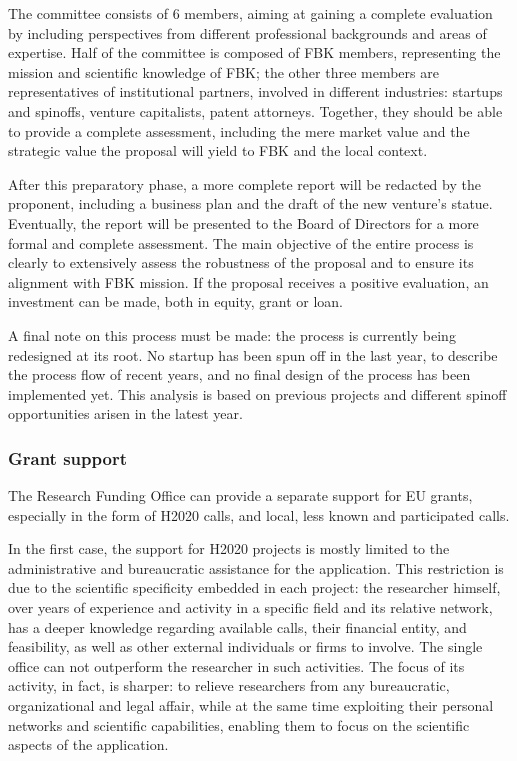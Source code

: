 The committee consists of 6 members, aiming at gaining a complete evaluation by including perspectives from different professional backgrounds and areas of expertise. Half of the committee is composed of FBK members, representing the mission and scientific knowledge of FBK; the other three members are representatives of institutional partners, involved in different industries: startups and spinoffs, venture capitalists, patent attorneys. Together, they should be able to provide a complete assessment, including the mere market value and the strategic value the proposal will yield to FBK and the local context.

After this preparatory phase, a more complete report will be redacted by the proponent, including a business plan and the draft of the new venture's statue. Eventually, the report will be presented to the Board of Directors for a more formal and complete assessment. The main objective of the entire process is clearly to extensively assess the robustness of the proposal and to ensure its alignment with FBK mission. If the proposal receives a positive evaluation, an investment can be made, both in equity, grant or loan.

A final note on this process must be made: the process is currently being redesigned at its root. No startup has been spun off in the last year, to describe the process flow of recent years, and no final design of the process has been implemented yet. This analysis is based on previous projects and different spinoff opportunities arisen in the latest year.	

\subsubsection{Grant support}

The Research Funding Office can provide a separate support for EU grants, especially in the form of H2020 calls, and local, less known and participated calls.

In the first case, the support for H2020 projects is mostly limited to the administrative and bureaucratic assistance for the application. This restriction is due to the scientific specificity embedded in each project: the researcher himself, over years of experience and activity in a specific field and its relative network, has a deeper knowledge regarding available calls, their financial entity, and feasibility, as well as other external individuals or firms to involve. The single office can not outperform the researcher in such activities. The focus of its activity, in fact, is sharper: to relieve researchers from any bureaucratic, organizational and legal affair, while at the same time exploiting their personal networks and scientific capabilities, enabling them to focus on the scientific aspects of the application.

